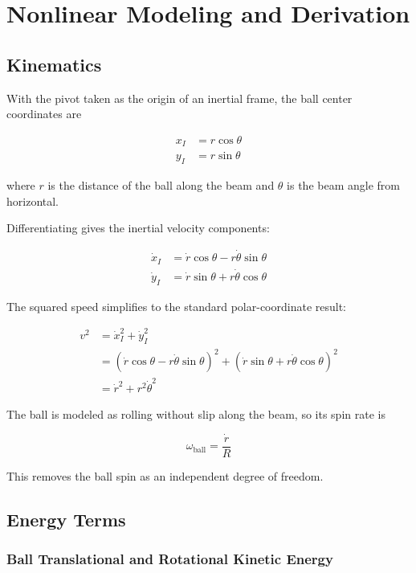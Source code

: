 \chapter{Nonlinear Modeling and Derivation}

\section{Kinematics}

With the pivot taken as the origin of an inertial frame, the ball center coordinates are

\begin{align}
  x_I &= r \cos \theta \\
  y_I &= r \sin \theta
\end{align}

where $r$ is the distance of the ball along the beam and $\theta$ is the beam angle from
horizontal.

Differentiating gives the inertial velocity components:

\begin{align}
  \dot{x}_I &= \dot{r}\cos\theta - r\dot{\theta}\sin\theta \\
  \dot{y}_I &= \dot{r}\sin\theta + r\dot{\theta}\cos\theta
\end{align}

The squared speed simplifies to the standard polar-coordinate result:

\begin{align}
  v^2
  &= \dot{x}_I^2 + \dot{y}_I^2 \\
  &= \left(\dot{r}\cos\theta - r\dot{\theta}\sin\theta\right)^2
   + \left(\dot{r}\sin\theta + r\dot{\theta}\cos\theta\right)^2 \\
  &= \dot{r}^2 + r^2 \dot{\theta}^2
\end{align}

The ball is modeled as rolling without slip along the beam, so its spin rate is

\begin{equation}
  \omega_{\text{ball}} = \frac{\dot{r}}{R}
\end{equation}

This removes the ball spin as an independent degree of freedom.

\section{Energy Terms}

\subsection{Ball Translational and Rotational Kinetic Energy}

